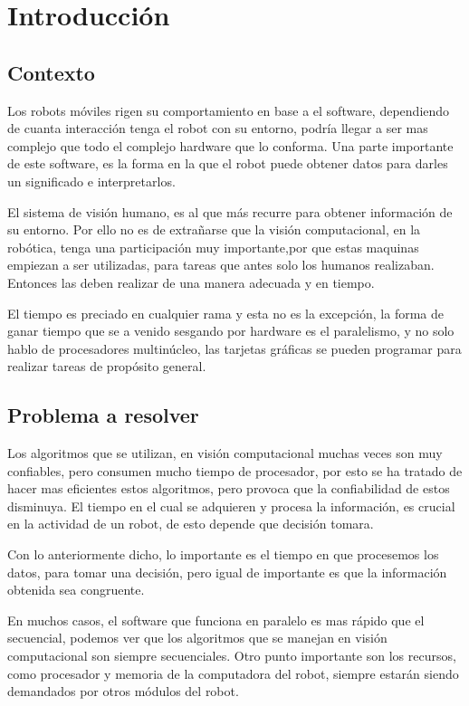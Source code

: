 \chapter{Introducción}

\section{Contexto}
Los robots móviles rigen su comportamiento en base a el software, dependiendo de cuanta interacción tenga el robot con su entorno, podría llegar a ser mas complejo que todo el complejo hardware que lo conforma. Una parte importante de este software, es la forma en la que el robot puede obtener datos para darles un significado e interpretarlos. 

El sistema de visión humano, es al que más recurre para obtener información de su entorno. Por ello no es de extrañarse que la visión computacional, en la robótica, tenga una participación muy importante,por que estas maquinas empiezan a ser utilizadas, para tareas que antes solo los humanos realizaban. Entonces las deben realizar de una manera adecuada y en tiempo. 

El tiempo es preciado en cualquier rama y esta no es la excepción, la forma de ganar tiempo que se a venido sesgando por hardware es el paralelismo, y no solo hablo de procesadores multinúcleo, las tarjetas gráficas se pueden programar para realizar tareas de propósito general.   

\section{Problema a resolver}
Los algoritmos que se utilizan, en visión computacional muchas veces son muy confiables, pero consumen mucho tiempo de procesador, por esto se ha tratado de hacer mas eficientes estos algoritmos, pero provoca que  la confiabilidad de estos disminuya. El tiempo en el cual se adquieren y procesa la información, es crucial en la actividad de un robot, de esto depende que decisión tomara.

Con lo anteriormente dicho, lo importante es el tiempo en que procesemos los datos, para tomar una decisión, pero igual de importante es que la información obtenida sea congruente. 

En muchos casos, el software que funciona en paralelo es mas rápido que el secuencial, podemos ver que los algoritmos que se manejan en visión computacional son siempre secuenciales. Otro punto importante son los recursos, como procesador y memoria de la computadora del robot, siempre estarán siendo demandados por otros módulos del robot.    

